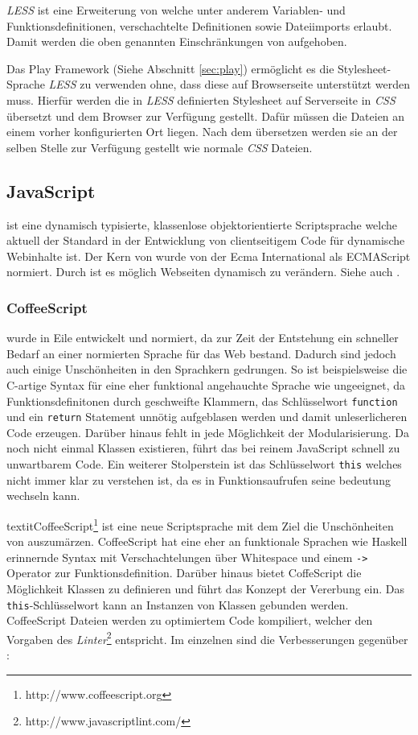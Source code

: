 \textit{LESS} ist eine Erweiterung von  welche unter anderem  Variablen- und
Funktionsdefinitionen, verschachtelte Definitionen sowie  Dateiimports erlaubt. Damit werden die
oben genannten Einschränkungen von  aufgehoben.

Das Play Framework (Siehe Abschnitt \ref{sec:play}) ermöglicht es die Stylesheet-Sprache
\textit{LESS} zu verwenden ohne,  dass diese auf Browserseite unterstützt werden muss. Hierfür
werden die in  \textit{LESS} definierten Stylesheet auf Serverseite in \textit{CSS} übersetzt  und
dem Browser zur Verfügung gestellt. Dafür müssen die Dateien an einem vorher konfigurierten Ort
liegen. Nach dem  übersetzen werden sie an der selben Stelle zur Verfügung gestellt wie normale
\textit{CSS} Dateien.

\subsection{JavaScript}

 ist eine dynamisch typisierte, klassenlose objektorientierte Scriptsprache welche aktuell
der Standard in der Entwicklung von clientseitigem Code für dynamische Webinhalte ist. Der Kern von
 wurde von der Ecma International als ECMAScript normiert. Durch  ist es
möglich Webseiten dynamisch zu verändern. Siehe auch \cite{js}.

\subsubsection{CoffeeScript}
\label{sec:coffeescript}

 wurde in Eile entwickelt und normiert, da zur Zeit der Entstehung ein schneller Bedarf an
einer normierten Sprache für das Web bestand. Dadurch sind jedoch auch einige Unschönheiten in den
Sprachkern gedrungen. So ist beispielsweise die C-artige Syntax für eine eher funktional angehauchte
Sprache wie  ungeeignet, da Funktionsdefinitonen durch geschweifte Klammern, das
Schlüsselwort \texttt{function} und ein \texttt{return} Statement unnötig aufgeblasen werden und
damit unleserlicheren Code erzeugen. Darüber hinaus fehlt in  jede Möglichkeit der
Modularisierung. Da noch nicht einmal Klassen existieren, führt das bei reinem JavaScript schnell zu
unwartbarem Code. Ein weiterer Stolperstein ist das Schlüsselwort \texttt{this} welches nicht immer
klar zu verstehen ist, da es in Funktionsaufrufen seine bedeutung wechseln kann.

textit{CoffeeScript}\footnote{http://www.coffeescript.org} ist eine neue Scriptsprache mit dem Ziel
die Unschönheiten von  auszumärzen. CoffeeScript hat eine eher an funktionale Sprachen wie
Haskell erinnernde Syntax mit Verschachtelungen über Whitespace und einem \texttt{->} Operator zur
Funktionsdefinition. Darüber hinaus bietet CoffeScript die Möglichkeit Klassen zu definieren und
führt das Konzept der Vererbung ein. Das \texttt{this}-Schlüsselwort kann an Instanzen von Klassen
gebunden werden. CoffeeScript Dateien werden zu optimiertem  Code kompiliert, welcher den
Vorgaben des \textit{ Linter}\footnote{http://www.javascriptlint.com/} entspricht. Im
einzelnen sind die Verbesserungen gegenüber :

